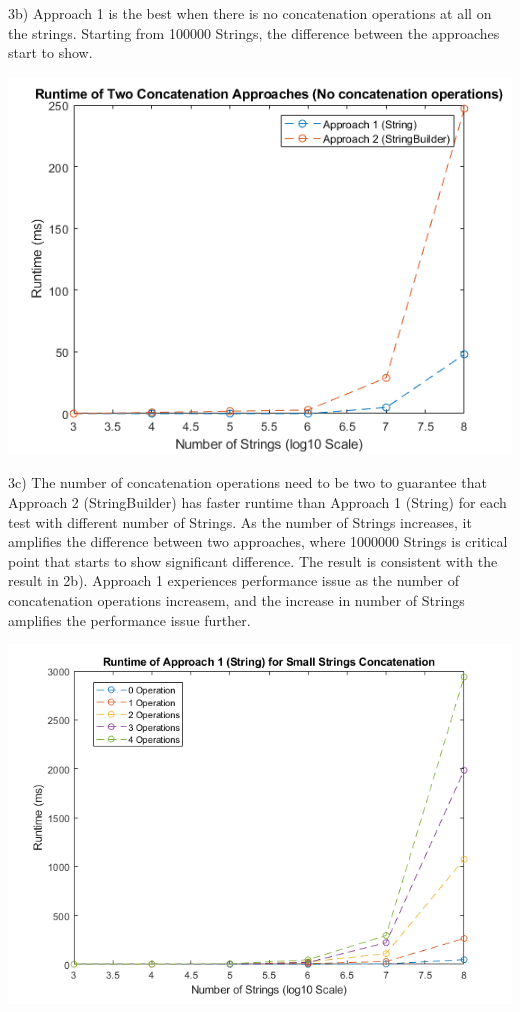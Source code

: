 \documentclass[a4paper]{article}
\begin{document}
3b) Approach 1 is the best when there is no concatenation operations at all on the strings. Starting from 100000 Strings, the difference between the approaches start to show.

\includegraphics[width=\textwidth]{3b.png}

3c) The number of concatenation operations need to be two to guarantee that Approach 2 (StringBuilder) has faster runtime than Approach 1 (String) for each test with different number of Strings. As the number of Strings increases, it amplifies the difference between two approaches, where 1000000 Strings is critical point that starts to show significant difference. The result is consistent with the result in 2b). Approach 1 experiences performance issue as the number of concatenation operations increasem, and the increase in number of Strings amplifies the performance issue further.

\includegraphics[width=\textwidth]{3cA1.png}
\end{document}
